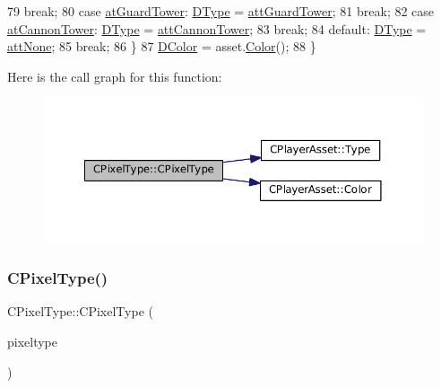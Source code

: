\begin{DoxyCode}
79                                 \textcolor{keywordflow}{break};
80         \textcolor{keywordflow}{case} \hyperlink{GameDataTypes_8h_a5600d4fc433b83300308921974477feca65fa6c84ff93972a623793d4ee72d87f}{atGuardTower}:      \hyperlink{classCPixelType_aca37f042b510a349e0d3209c73ae51c5}{DType} = \hyperlink{classCPixelType_af06457fd1c2ff34c67ce670e633a10b0ab5afa80bf72a1e1fd366490591794229}{attGuardTower};
81                                 \textcolor{keywordflow}{break};
82         \textcolor{keywordflow}{case} \hyperlink{GameDataTypes_8h_a5600d4fc433b83300308921974477feca226f6f1968ce76c97cdabb780a6c289d}{atCannonTower}:     \hyperlink{classCPixelType_aca37f042b510a349e0d3209c73ae51c5}{DType} = \hyperlink{classCPixelType_af06457fd1c2ff34c67ce670e633a10b0a9220629e324fc6cfb6eb9e0f9853354c}{attCannonTower};
83                                 \textcolor{keywordflow}{break};
84         \textcolor{keywordflow}{default}:                \hyperlink{classCPixelType_aca37f042b510a349e0d3209c73ae51c5}{DType} = \hyperlink{classCPixelType_af06457fd1c2ff34c67ce670e633a10b0a19050fdb98082f54b7a4e9365912763b}{attNone};
85                                 \textcolor{keywordflow}{break};
86     \}
87     \hyperlink{classCPixelType_a474243cf748aee94cfa207659e940b6c}{DColor} = asset.\hyperlink{classCPlayerAsset_a969e6e60c6343186d2b9a6cddd6654f8}{Color}();
88 \}
\end{DoxyCode}
Here is the call graph for this function\+:\nopagebreak
\begin{figure}[H]
\begin{center}
\leavevmode
\includegraphics[width=350pt]{classCPixelType_abf05fa378b6e924c40d3616d6c718557_cgraph}
\end{center}
\end{figure}
\hypertarget{classCPixelType_a393a54c12c99809690961764f8f002fe}{}\label{classCPixelType_a393a54c12c99809690961764f8f002fe} 
\subsubsection{\texorpdfstring{C\+Pixel\+Type()}{CPixelType()}\hspace{0.1cm}{\footnotesize\ttfamily [4/4]}}
{\footnotesize\ttfamily C\+Pixel\+Type\+::\+C\+Pixel\+Type (\begin{DoxyParamCaption}\item[{const \hyperlink{classCPixelType}{C\+Pixel\+Type} \&}]{pixeltype }\end{DoxyParamCaption})}



